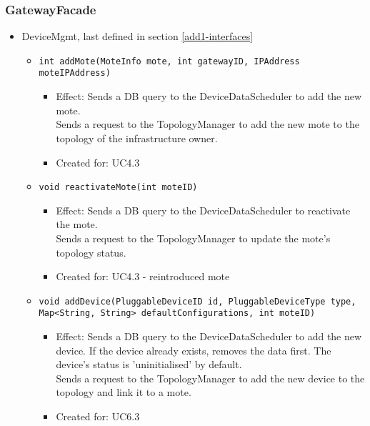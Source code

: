 {{{    \subsubsection{GatewayFacade}
        \begin{itemize}
            \item DeviceMgmt, last defined in section \ref{add1-interfaces}
            \begin{itemize}
                \item \texttt{int addMote(MoteInfo mote, int gatewayID, IPAddress moteIPAddress)}
                    \begin{itemize}
                        \item Effect: Sends a DB query to the DeviceDataScheduler to add the new mote. \\
                              Sends a request to the TopologyManager to add the new mote to the topology of the infrastructure owner.
                        \item Created for: UC4.3
                    \end{itemize}
                \item \texttt{void reactivateMote(int moteID)}
                    \begin{itemize}
                        \item Effect: Sends a DB query to the DeviceDataScheduler to reactivate the mote. \\
                              Sends a request to the TopologyManager to update the mote's topology status.
                        \item Created for: UC4.3 - reintroduced mote
                    \end{itemize}
                \item \texttt{void addDevice(PluggableDeviceID id, PluggableDeviceType type, Map<String, String> defaultConfigurations, int moteID)}
                    \begin{itemize}
                        \item Effect: Sends a DB query to the DeviceDataScheduler to add the new device. If the device already exists, removes the data first. The device's status is 'uninitialised' by default. \\
                              Sends a request to the TopologyManager to add the new device to the topology and link it to a mote.
                        \item Created for: UC6.3
                    \end{itemize}

\end{itemize}
\end{itemize}}}}
